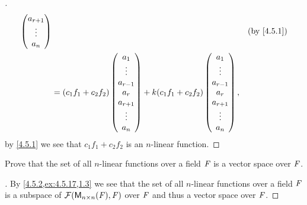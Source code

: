 \begin{proof}[]
\begin{align*}
\begin{pmatrix}
			                                           a_{r + 1} \\
			                                           \vdots    \\
			                                           a_n
		                                           \end{pmatrix}             &  & \by{4.5.1} \\
		 & = (c_1 f_1 + c_2 f_2)\begin{pmatrix}
			                        a_1       \\
			                        \vdots    \\
			                        a_{r - 1} \\
			                        a_r       \\
			                        a_{r + 1} \\
			                        \vdots    \\
			                        a_n
		                        \end{pmatrix} + k (c_1 f_1 + c_2 f_2)\begin{pmatrix}
			                                                             a_1       \\
			                                                             \vdots    \\
			                                                             a_{r - 1} \\
			                                                             a_r       \\
			                                                             a_{r + 1} \\
			                                                             \vdots    \\
			                                                             a_n
		                                                             \end{pmatrix},
	\end{align*}
	by \cref{4.5.1} we see that \(c_1 f_1 + c_2 f_2\) is an \(n\)-linear function.
\end{proof}

\begin{ex}\label{ex:4.5.18}
	Prove that the set of all \(n\)-linear functions over a field \(\mathit{F}\) is a vector space over \(\mathit{F}\).
\end{ex}

\begin{proof}[]
	By \cref{4.5.2,ex:4.5.17,1.3} we see that the set of all \(n\)-linear functions over a field \(\mathit{F}\) is a subspace of \(\fs(\ms[n][n][\F], \F)\) over \(\mathit{F}\) and thus a vector space over \(\mathit{F}\).
\end{proof}

